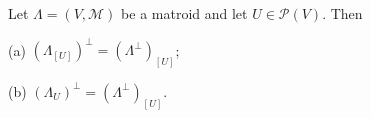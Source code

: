 Let $\Lambda = (V, \mathcal{M})$ be a matroid and let $U \in \mathcal{P}(V)$. Then

(a) $(\Lambda_{[U]})^\perp = (\Lambda^\perp)_{[U]}$;

(b) $(\Lambda_U)^\perp = (\Lambda^\perp)_{[U]}$.
